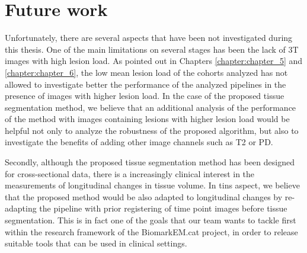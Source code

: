 	


\section{Future work}

Unfortunately, there are several aspects that have been not investigated during this thesis. One of the main limitations on several stages has been the lack of 3T images with high lesion load. As pointed out in Chapters \ref{chapter:chapter_5} and \ref{chapter:chapter_6}, the low mean lesion load of the cohorts analyzed has not allowed to investigate better the performance of the analyzed pipelines in the presence of images with higher lesion load. In the case of the proposed tissue segmentation method, we believe that an additional analysis of the performance of the method with images containing lesions with higher lesion load would be helpful not only to analyze the robustness of the proposed algorithm, but also to investigate the benefits of adding other image channels such as T2 or PD. 

Secondly, although the proposed tissue segmentation method has been designed for cross-sectional data, there is a increasingly clinical interest in the measurements of longitudinal changes in tissue volume. In tins aspect, we believe that the proposed method would be also adapted to longitudinal changes by re-adapting the pipeline with prior registering of time point images before tissue segmentation. This is in fact one of the goals that our team wants to tackle first within the research framework of the BiomarkEM.cat project, in order to release suitable tools that can be used in clinical settings. 

 


